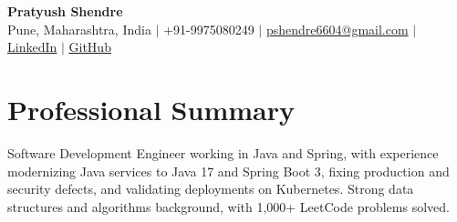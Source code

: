 \documentclass[a4paper,11pt]{article}
\begin{document}
\begin{center}
  {\Large\bfseries Pratyush Shendre}\\[2pt]
  \small Pune, Maharashtra, India $|$ +91-9975080249 $|$
  \href{mailto:pshendre6604@gmail.com}{pshendre6604@gmail.com} $|$
  \href{https://www.linkedin.com/in/pratyush-shendre-2256a7223/}{\underline{LinkedIn}} $|$
  \href{https://github.com/PratyushS04}{\underline{GitHub}}
\end{center}

\section{Professional Summary}
\small Software Development Engineer working in Java and Spring, with experience modernizing Java services to Java 17 and Spring Boot 3, f{}ixing production and security defects, and validating deployments on Kubernetes. Strong data structures and algorithms background, with 1,000+ LeetCode problems solved.
\end{document}
